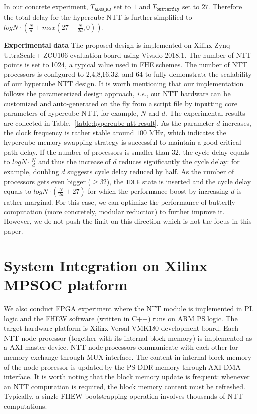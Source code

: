 \documentclass{iacrtrans}
\theoremstyle{plain}
\begin{document}
In our concrete experiment, $T_{\texttt{ADDR\_RD}}$ set to $1$ and $T_{\texttt{butterfly}}$ set to $27$. Therefore the total delay for the hypercube NTT is further simplified to $logN\cdot(\frac{N}{d}+max(27-\frac{N}{2d},0))$.


\textbf{Experimental data} The proposed design is implemented on Xilinx Zynq UltraScale+ ZCU106 evaluation board using Vivado 2018.1. The number of NTT points is set to 1024, a typical value used in FHE schemes. The number of NTT processors is configured to 2,4,8,16,32, and 64 to fully demonstrate the scalability of our hypercube NTT design. It is worth mentioning that our implementation follows the parameterized design approach, \textit{i.e.}, our NTT hardware can be customized and auto-generated on the fly from a script file by inputting core parameters of hypercube NTT, for example, $N$ and $d$. The experimental results are collected in Table.~\ref{table:hypercube-ntt-result}. As the parameter $d$ increases, the clock frequency is rather stable around $100$ MHz, which indicates the hypercube memory swapping strategy is successful to maintain a good critical path delay. 
If the number of processors is smaller than $32$, the cycle delay equals to $logN\cdot\frac{N}{d}$ and thus the increase of $d$ reduces significantly the cycle delay: for example, doubling $d$ suggests cycle delay reduced by half. As the number of processors gets even bigger ($\geq 32$), the \texttt{IDLE} state is inserted and the cycle delay equals to $logN\cdot(\frac{N}{2d}+27)$ for which the performance boost by increasing $d$ is rather marginal.  For this case, we can optimize the performance of butterfly computation (more concretely, modular reduction) to further improve it. However, we do not push the limit on this direction which is not the focus in this paper.


\section{System Integration on Xilinx MPSOC platform}
We also conduct FPGA experiment where the NTT module is implemented in PL logic and the FHEW software (written in C++) runs on ARM PS logic. The target hardware platform is Xilinx Versal VMK180 development board. Each NTT node processor (together with its internal block memory) is implemented as a AXI master device. NTT node processors communicate with each other for memory exchange through MUX interface. The content in internal block memory of the node processor is updated by the PS DDR memory through AXI DMA interface. It is worth noting that the block memory update is frequent: whenever an NTT computation is required, the block memory content must be refreshed. Typically, a single FHEW bootstrapping operation involves thousands of NTT computations. 
\end{document}
